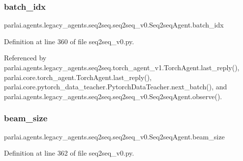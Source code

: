 \subsubsection{\texorpdfstring{batch\+\_\+idx}{batch\_idx}}
{\footnotesize\ttfamily parlai.\+agents.\+legacy\+\_\+agents.\+seq2seq.\+seq2seq\+\_\+v0.\+Seq2seq\+Agent.\+batch\+\_\+idx}



Definition at line 360 of file seq2seq\+\_\+v0.\+py.



Referenced by parlai.\+agents.\+legacy\+\_\+agents.\+seq2seq.\+torch\+\_\+agent\+\_\+v1.\+Torch\+Agent.\+last\+\_\+reply(), parlai.\+core.\+torch\+\_\+agent.\+Torch\+Agent.\+last\+\_\+reply(), parlai.\+core.\+pytorch\+\_\+data\+\_\+teacher.\+Pytorch\+Data\+Teacher.\+next\+\_\+batch(), and parlai.\+agents.\+legacy\+\_\+agents.\+seq2seq.\+seq2seq\+\_\+v0.\+Seq2seq\+Agent.\+observe().

\mbox{\label{classparlai_1_1agents_1_1legacy__agents_1_1seq2seq_1_1seq2seq__v0_1_1Seq2seqAgent_a215857d3ce2c7522c43728ab2879ce89}} 
\subsubsection{\texorpdfstring{beam\+\_\+size}{beam\_size}}
{\footnotesize\ttfamily parlai.\+agents.\+legacy\+\_\+agents.\+seq2seq.\+seq2seq\+\_\+v0.\+Seq2seq\+Agent.\+beam\+\_\+size}



Definition at line 362 of file seq2seq\+\_\+v0.\+py.



